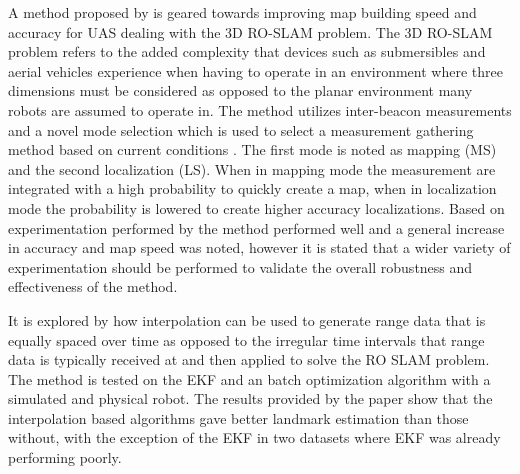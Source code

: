 \documentclass[conference]{IEEEtran}
\begin{document}
	
	
	
	
	
	A method proposed by \cite{Dios2015} is geared towards improving map building speed and accuracy for UAS dealing with the 3D RO-SLAM problem. The 3D RO-SLAM problem refers to the added complexity that devices such as submersibles \cite{Newman} and aerial vehicles experience when having to operate in an environment where three dimensions must be considered as opposed to the planar environment many robots are assumed to operate in. The method utilizes inter-beacon measurements and a novel mode selection which is used to select a measurement gathering method based on current conditions \cite{Dios2015}. The first mode is noted as mapping (MS) and the second localization (LS). When in mapping mode the measurement are integrated with a high probability to quickly create a map, when in localization mode the probability is lowered to create higher accuracy localizations. Based on experimentation performed by \cite{Dios2015} the method performed well and a general increase in accuracy and map speed was noted, however it is stated that a wider variety of experimentation should be performed to validate the overall robustness and effectiveness of the method.
	
	
	
	
	It is explored by \cite{Kehagias2006} how interpolation can be used to generate range data that is equally spaced over time as opposed to the irregular time intervals that range data is typically received at and then applied to solve the RO SLAM problem. The method is tested on the EKF and an batch optimization algorithm with a simulated and physical robot. The results provided by the paper show that the interpolation based algorithms gave better landmark estimation than those without, with the exception of the EKF in two datasets where EKF was already performing poorly.
	
	
	
	
	
\end{document}
